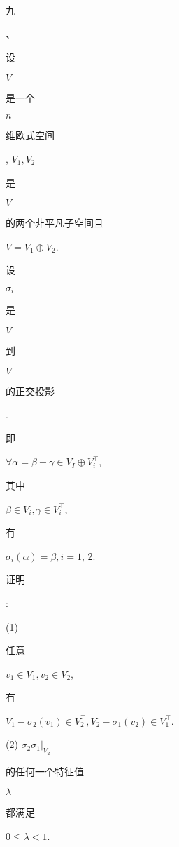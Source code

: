 \documentclass[10pt]{article}
\begin{document}
\begin{CJK}{UTF8}{mj}九\end{CJK}、\begin{CJK}{UTF8}{mj}设\end{CJK} $V$ \begin{CJK}{UTF8}{mj}是一个\end{CJK} $n$ \begin{CJK}{UTF8}{mj}维欧式空间\end{CJK}, $V_{1}, V_{2}$ \begin{CJK}{UTF8}{mj}是\end{CJK} $V$ \begin{CJK}{UTF8}{mj}的两个非平凡子空间且\end{CJK} $V=V_{1} \oplus V_{2}$. \begin{CJK}{UTF8}{mj}设\end{CJK} $\sigma_{i}$ \begin{CJK}{UTF8}{mj}是\end{CJK} $V$ \begin{CJK}{UTF8}{mj}到\end{CJK} $V$ \begin{CJK}{UTF8}{mj}的正交投影\end{CJK}. \begin{CJK}{UTF8}{mj}即\end{CJK} $\forall \alpha=\beta+\gamma \in V_{I} \oplus V_{i}^{\top}$, \begin{CJK}{UTF8}{mj}其中\end{CJK} $\beta \in V_{i}, \gamma \in V_{i}^{\top}$, \begin{CJK}{UTF8}{mj}有\end{CJK} $\sigma_{i}(\alpha)=\beta, i=1$, 2. \begin{CJK}{UTF8}{mj}证明\end{CJK}:

(1) \begin{CJK}{UTF8}{mj}任意\end{CJK} $v_{1} \in V_{1}, v_{2} \in V_{2}$, \begin{CJK}{UTF8}{mj}有\end{CJK} $V_{1}-\sigma_{2}\left(v_{1}\right) \in V_{2}^{\top}, V_{2}-\sigma_{1}\left(v_{2}\right) \in V_{1}^{\top}$.

(2) $\left.\sigma_{2} \sigma_{1}\right|_{V_{2}}$ \begin{CJK}{UTF8}{mj}的任何一个特征值\end{CJK} $\lambda$ \begin{CJK}{UTF8}{mj}都满足\end{CJK} $0 \leq \lambda<1$.
\end{document}
